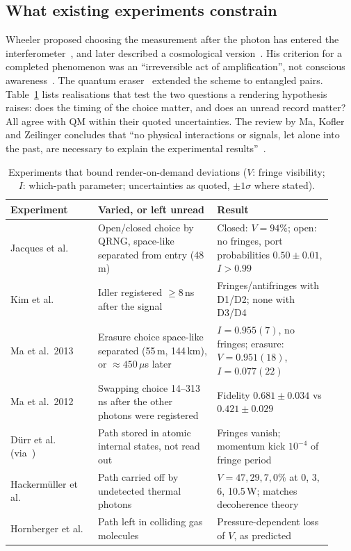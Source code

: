\subsection{What existing experiments constrain}
\label{sec:rendering-qm-constraints}

Wheeler proposed choosing the measurement after the photon has entered the
interferometer~\cite{Wheeler1978past}, and later described a cosmological
version~\cite{Wheeler1983law}. His criterion for a completed phenomenon was an
``irreversible act of amplification'', not conscious
awareness~\cite[Sec.~II.D]{Ma2016delayed}. The quantum
eraser~\cite{Scully1982quantum} extended the scheme to entangled pairs.
Table~\ref{tab:rendering-qm-exps} lists realisations that test the two
questions a rendering hypothesis raises: does the timing of the choice matter,
and does an unread record matter? All agree with QM within their quoted
uncertainties. The review by Ma, Kofler and Zeilinger concludes that ``no
physical interactions or signals, let alone into the past, are necessary to
explain the experimental results''~\cite[Sec.~VI]{Ma2016delayed}.

\begin{table}[t]
\centering
\small
\caption{Experiments that bound render-on-demand deviations ($V$: fringe
visibility; $I$: which-path parameter; uncertainties as quoted, $\pm1\sigma$
where stated).}
\label{tab:rendering-qm-exps}
\begin{tabular}{p{0.25\linewidth}p{0.34\linewidth}p{0.33\linewidth}}
\hline
Experiment & Varied, or left unread & Result \\
\hline
Jacques et al.~\cite{Jacques2007experimental} &
Open/closed choice by QRNG, space-like separated from entry (48\,m) &
Closed: $V=94\%$; open: no fringes, port probabilities $0.50\pm0.01$, $I>0.99$ \\
Kim et al.~\cite{Kim2000delayed} &
Idler registered $\geq8$\,ns after the signal &
Fringes/antifringes with D1/D2; none with D3/D4 \\
Ma et al.\ 2013~\cite{Ma2013quantum} &
Erasure choice space-like separated (55\,m, 144\,km), or $\approx450\,\mu$s later &
$I=0.955(7)$, no fringes; erasure: $V=0.951(18)$, $I=0.077(22)$ \\
Ma et al.\ 2012~\cite{Ma2012experimental} &
Swapping choice 14--313\,ns after the other photons were registered &
Fidelity $0.681\pm0.034$ vs $0.421\pm0.029$ \\
D\"urr et al.~\cite{Durr1998origin} (via~\cite{Ma2016delayed}) &
Path stored in atomic internal states, not read out &
Fringes vanish; momentum kick $10^{-4}$ of fringe period \\
Hackerm\"uller et al.~\cite{Hackermuller2004decoherence} &
Path carried off by undetected thermal photons &
$V=47,29,7,0\%$ at 0, 3, 6, 10.5\,W; matches decoherence theory \\
Hornberger et al.~\cite{Hornberger2003collisional} &
Path left in colliding gas molecules &
Pressure-dependent loss of $V$, as predicted \\
\hline
\end{tabular}
\end{table}

